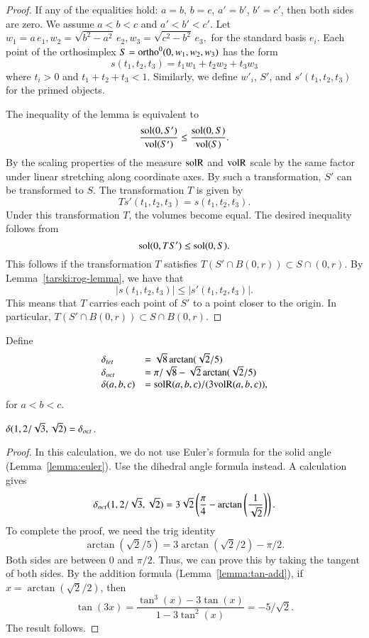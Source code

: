 \begin{proof} If any of the equalities hold: $a=b$, $b=c$, $a'=b'$,
$b'=c'$, then both sides are zero.  We assume $a<b<c$ and $a'<b'<c'$.
Let $w_1=a\,e_1,w_2=\sqrt{b^2-a^2}\, e_2,w_3=\sqrt{c^2-b^2}\, e_3,$
for the standard basis $e_i$.  Each point of the orthosimplex
$S = {\operatorname{ortho}}^0(0,w_1,w_2,w_3)$ has
the form
   $$s(t_1,t_2,t_3) = t_1 w_1 + t_2 w_2 + t_3 w_3$$
where $t_i>0$ and $t_1+t_2+t_3< 1$.  Similarly,
we define $w'_i$, $S'$, and $s'(t_1,t_2,t_3)$ for the primed objects.

The inequality of the lemma is equivalent to
  $$
  \frac{\operatorname{sol}(0,S')}{{\operatorname{vol}}(S')} \le \frac{\operatorname{sol}(0,S)}{{\operatorname{vol}}(S)}.
  $$
By the scaling properties of the measure ${\operatorname{solR}}$ and ${\operatorname{volR}}$
scale by the same factor under linear stretching along coordinate axes.
By such a transformation, $S'$ can be transformed to $S$.  The
transformation $T$ is given by 
   $$
   T s'(t_1,t_2,t_3) = s(t_1,t_2,t_3).
   $$
Under this transformation $T$, the volumes become equal.
The desired inequality follows from
   $$
   \operatorname{sol}(0,T S') \le \operatorname{sol}(0,S).
   $$
This follows if the transformation $T$ satisfies
   $T(S'\cap B(0,r))\subset S\cap (0,r)$.
By Lemma~\ref{tarski:rog-lemma}, we have that 
   $$|s(t_1,t_2,t_3)|\le |s'(t_1,t_2,t_3)|.$$
This means that $T$ carries each point of $S'$ to a point closer to
the origin.  In particular,
  $T(S'\cap B(0,r))\subset S\cap B(0,r)$.
\end{proof}

\begin{definition}  Define 
  $$
  \begin{array}{lll}
  \delta_{tet} &= \sqrt8 \arctan(\sqrt2/5)\\
  \delta_{oct} &= \pi/\sqrt8 - \sqrt2 \arctan(\sqrt2/5)\\
  \delta(a,b,c)&= {\operatorname{solR}}(a,b,c)/(3{\operatorname{volR}}(a,b,c)),
  \end{array}
  $$
for $a<b<c$.  
\end{definition}

\begin{lemma}
  $\delta(1,2/\sqrt{3},\sqrt2)=\delta_{oct}$.
\end{lemma}

\begin{proof}  In this calculation, we do not use Euler's formula
for the solid angle (Lemma~\ref{lemma:euler}).  
Use the dihedral angle formula instead.
A calculation gives
  $$
  \delta_{oct}(1,2/\sqrt{3},\sqrt2)=
  3 \sqrt{2} \left(\frac{\pi }{4}-\arctan
   \left(\frac{1}{\sqrt{2}}\right)\right).$$
To complete the proof, we need the trig identity
  $$\arctan(\sqrt2/5)  = 3\arctan(\sqrt2/2)-\pi/2.$$
Both sides are between $0$ and $\pi/2$.  Thus, we can prove this
by taking the tangent of both sides. By the addition formula
(Lemma~\ref{lemma:tan-add}),
if $x=\arctan(\sqrt2/2)$, then
   $$\tan(3 x) = \frac{\tan^3(x) - 3\tan(x)}{1-3 \tan^2(x)} = -5/\sqrt2.$$
The result follows.
\end{proof}

